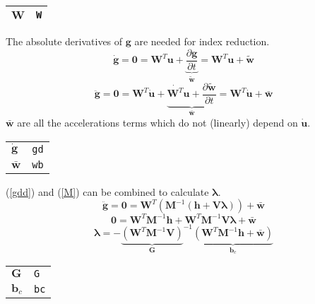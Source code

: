 \documentclass{report}
\newcommand{\bs}[1]{\boldsymbol #1}
\begin{document}
\begin{tabular}{|l|l|}
  \hline
  $\bs{W}$ & \texttt{W} \\
  \hline
\end{tabular}

The absolute derivatives of $\bs{g}$ are needed for index reduction.
\begin{equation}
  \dot{\bs{g}}=\bs{0}=\bs{W}^T \bs{u}+\underbrace{\frac{\partial\bs{g}}{\partial t}}_{\tilde{\bs{w}}}=\bs{W}^T \bs{u}+\tilde{\bs{w}}
\end{equation}
\begin{equation}
  \ddot{\bs{g}}=\bs{0}=\bs{W}^T \dot{\bs{u}} + \underbrace{\dot{\bs{W}^T}\bs{u}+\frac{\partial\tilde{\bs{w}}}{\partial t}}_{\bar{\bs{w}}}=\bs{W}^T \dot{\bs{u}} + \bar{\bs{w}}
  \label{gdd}
\end{equation}
$\bar{\bs{w}}$ are all the accelerations terms which do not (linearly) depend on $\dot{\bs{u}}$.

\begin{tabular}{|l|l|}
  \hline
  $\dot{\bs{g}}$ & \texttt{gd} \\
  $\bar{\bs{w}}$ & \texttt{wb} \\
  \hline
\end{tabular}

(\ref{gdd}) and (\ref{M}) can be combined to calculate $\bs{\lambda}$.
\begin{equation}
  \ddot{\bs{g}}=\bs{0}=\bs{W}^T \left( \bs{M}^{-1}\left(\bs{h}+\bs{V}\bs{\lambda}\right) \right) + \bar{\bs{w}}
\end{equation}
\begin{equation}
  \bs{0}=\bs{W}^T \bs{M}^{-1}\bs{h}+\bs{W}^T \bs{M}^{-1}\bs{V}\bs{\lambda} + \bar{\bs{w}}
\end{equation}
\begin{equation}
  \bs{\lambda}=-{\underbrace{\left(\bs{W}^T \bs{M}^{-1}\bs{V}\right)}_{\bs{G}}}^{-1}\underbrace{\left( \bs{W}^T \bs{M}^{-1}\bs{h} + \bar{\bs{w}} \right)}_{\bs{b}_c}
\end{equation}

\begin{tabular}{|l|l|}
  \hline
  $\bs{G}$ & \texttt{G} \\
  $\bs{b}_c$ & \texttt{bc} \\
  \hline
\end{tabular}
\end{document}
